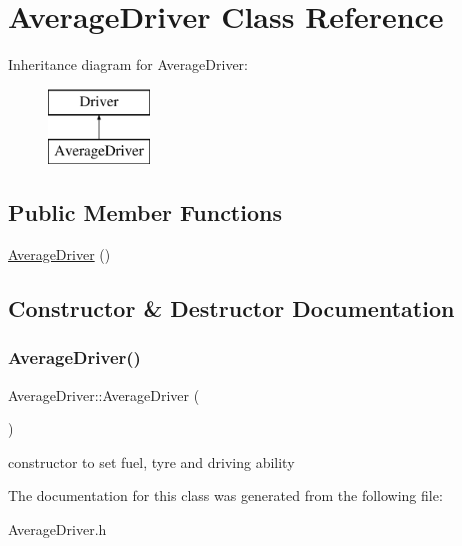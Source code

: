 \hypertarget{class_average_driver}{}\section{Average\+Driver Class Reference}
\label{class_average_driver}
Inheritance diagram for Average\+Driver\+:\begin{figure}[H]
\begin{center}
\leavevmode
\includegraphics[height=2.000000cm]{class_average_driver}
\end{center}
\end{figure}
\subsection*{Public Member Functions}
\begin{DoxyCompactItemize}
\item 
\mbox{\hyperlink{class_average_driver_a8e62975a593443588e5e95895de026f7}{Average\+Driver}} ()
\end{DoxyCompactItemize}


\subsection{Constructor \& Destructor Documentation}
\mbox{\label{class_average_driver_a8e62975a593443588e5e95895de026f7}} 
\subsubsection{\texorpdfstring{Average\+Driver()}{AverageDriver()}}
{\footnotesize\ttfamily Average\+Driver\+::\+Average\+Driver (\begin{DoxyParamCaption}{ }\end{DoxyParamCaption})\hspace{0.3cm}{\ttfamily [inline]}}

constructor to set fuel, tyre and driving ability 

The documentation for this class was generated from the following file\+:\begin{DoxyCompactItemize}
\item 
Average\+Driver.\+h\end{DoxyCompactItemize}
